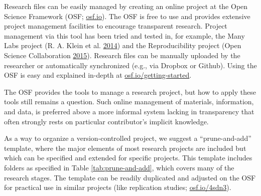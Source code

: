 \documentclass[a5paper]{book}
\begin{document}
Research files can be easily managed by creating an online project at
the Open Science Framework (OSF; \href{https://osf.io}{osf.io}). The OSF
is free to use and provides extensive project management facilities to
encourage transparent research. Project management via this tool has
been tried and tested in, for example, the Many Labs project (R. A.
Klein et al.
\protect\hyperlink{ref-doi:10.1027ux2f1864-9335ux2fa000178}{2014}) and
the Reproducibility project (Open Science Collaboration
\protect\hyperlink{ref-doi:10.1126ux2fscience.aac4716}{2015}). Research
files can be manually uploaded by the researcher or automatically
synchronized (e.g., via Dropbox or Github). Using the OSF is easy and
explained in-depth at
\href{https://osf.io/getting-started}{osf.io/getting-started}.

The OSF provides the tools to manage a research project, but how to
apply these tools still remains a question. Such online management of
materials, information, and data, is preferred above a more informal
system lacking in transparency that often strongly rests on particular
contributor's implicit knowledge.

As a way to organize a version-controlled project, we suggest a
\enquote{prune-and-add} template, where the major elements of most
research projects are included but which can be specified and extended
for specific projects. This template includes folders as specified in
Table \ref{tab:prune-and-add}, which covers many of the research stages.
The template can be readily duplicated and adjusted on the OSF for
practical use in similar projects (like replication studies;
\href{https://osf.io/4sdn3}{osf.io/4sdn3}).
\end{document}
